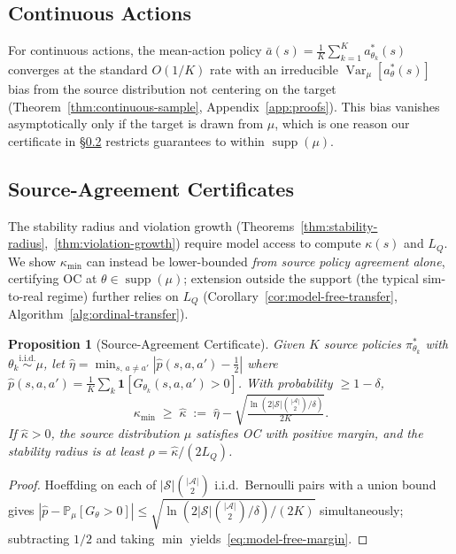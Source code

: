 \documentclass{article}
\newtheorem{proposition}{Proposition}
\newcommand{\Prob}{\mathbb{P}}
\newcommand{\ind}{\mathbf{1}}
\newcommand{\cS}{\mathcal{S}}
\newcommand{\cA}{\mathcal{A}}
\DeclareMathOperator{\Var}{Var}
\begin{document}
\subsection{Continuous Actions}
\label{sec:sample-continuous}

For continuous actions, the mean-action policy $\bar{a}(s) = \frac{1}{K}\sum_{k=1}^K a^*_{\theta_k}(s)$ converges at the standard $O(1/K)$ rate with an irreducible $\Var_\mu[a^*_\theta(s)]$ bias from the source distribution not centering on the target (Theorem~\ref{thm:continuous-sample}, Appendix~\ref{app:proofs}). This bias vanishes asymptotically only if the target is drawn from $\mu$, which is one reason our certificate in \S\ref{sec:model-free} restricts guarantees to within $\operatorname{supp}(\mu)$.

\subsection{Source-Agreement Certificates}
\label{sec:model-free}

The stability radius and violation growth (Theorems~\ref{thm:stability-radius},~\ref{thm:violation-growth}) require model access to compute $\kappa(s)$ and $L_Q$. We show $\kappa_{\min}$ can instead be lower-bounded \emph{from source policy agreement alone}, certifying OC at $\theta \in \operatorname{supp}(\mu)$; extension outside the support (the typical sim-to-real regime) further relies on $L_Q$ (Corollary~\ref{cor:model-free-transfer}, Algorithm~\ref{alg:ordinal-transfer}).

\begin{proposition}[Source-Agreement Certificate]
\label{prop:model-free}
Given $K$ source policies $\pi^*_{\theta_k}$ with $\theta_k \overset{\text{i.i.d.}}{\sim} \mu$, let $\hat{\eta} = \min_{s,\,a \neq a'} |\hat{p}(s, a, a') - \tfrac{1}{2}|$ where $\hat{p}(s, a, a') = \frac{1}{K}\sum_k \ind[G_{\theta_k}(s, a, a') > 0]$. With probability $\geq 1 - \delta$,
\begin{equation}
\label{eq:model-free-margin}
\kappa_{\min} \;\geq\; \hat{\kappa} \;:=\; \hat{\eta} - \sqrt{\tfrac{\ln(2|\cS|\binom{|\cA|}{2}/\delta)}{2K}}.
\end{equation}
If $\hat{\kappa} > 0$, the source distribution $\mu$ satisfies OC with positive margin, and the stability radius is at least $\hat{\rho} = \hat{\kappa}/(2L_Q)$.
\end{proposition}

\begin{proof}
Hoeffding on each of $|\cS|\binom{|\cA|}{2}$ i.i.d.\ Bernoulli pairs with a union bound gives $|\hat{p} - \Prob_\mu[G_\theta > 0]| \leq \sqrt{\ln(2|\cS|\binom{|\cA|}{2}/\delta)/(2K)}$ simultaneously; subtracting $1/2$ and taking $\min$ yields~\eqref{eq:model-free-margin}.
\end{proof}
\end{document}
